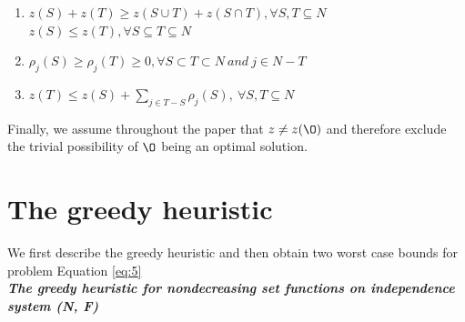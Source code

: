 \documentclass[11pt,a4paper,oneside]{report}
\begin{document}
\begin{enumerate}
\item $z(S) + z(T) \geq z(S \cup T) + z(S \cap T), \forall S, T \subseteq N$\\
$z(S) \leq z(T), \forall S \subseteq T \subseteq N$
\item $\rho_j(S) \geq \rho_j(T) \geq 0, \forall S \subset T \subset N\  and\  j \in N-T$
\item $z(T) \leq z(S) + \sum\limits_{j \in T-S}\rho_j(S),\  \forall S, T \subseteq N$
\end{enumerate}

Finally, we assume throughout the paper that $z \neq z({\O})$ and therefore exclude the trivial possibility of ${\O}$ being an optimal solution.

\section{The greedy heuristic}
We first describe the greedy heuristic and then obtain two worst case bounds for problem Equation \ref{eq:5}\\
\textit{\textbf{The greedy heuristic for nondecreasing set functions on independence system (N, F)}}





%
\end{document}
